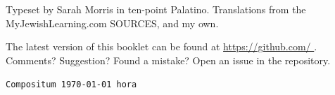 \documentclass[a5paper,10pt]{memoir}
\begin{document}
\ChadGayahText

\vfill
%
Typeset by Sarah Morris in ten-point Palatino.  Translations from the
MyJewishLearning.com SOURCES, and my own.

% 
The latest version of this booklet can be found at
\url{ https://github.com/ }. Comments?
Suggestion? Found a mistake? Open an issue in the repository.
% 

{\centering\footnotesize\texttt{Compositum \today\ hora \currenttime}\par}
\end{document}
